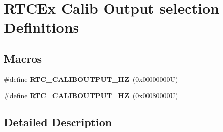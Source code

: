 \hypertarget{group___r_t_c_ex___calib___output__selection___definitions}{}\section{R\+T\+C\+Ex Calib Output selection Definitions}
\label{group___r_t_c_ex___calib___output__selection___definitions}
\subsection*{Macros}
\begin{DoxyCompactItemize}
\item 
\mbox{\label{group___r_t_c_ex___calib___output__selection___definitions_ga8647cd287c7dfe52f29793be07817bac}} 
\#define {\bfseries R\+T\+C\+\_\+\+C\+A\+L\+I\+B\+O\+U\+T\+P\+U\+T\+\_\+HZ}~(0x00000000\+U)
\item 
\mbox{\label{group___r_t_c_ex___calib___output__selection___definitions_gaf97fb10389fb13d16c2f2859f8d228c2}} 
\#define {\bfseries R\+T\+C\+\_\+\+C\+A\+L\+I\+B\+O\+U\+T\+P\+U\+T\+\_\+HZ}~(0x00080000\+U)
\end{DoxyCompactItemize}


\subsection{Detailed Description}
